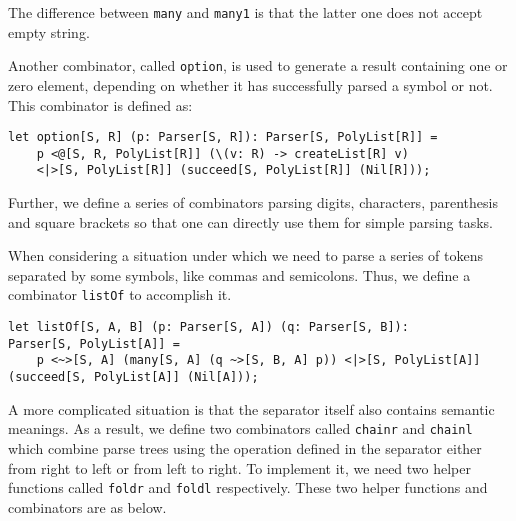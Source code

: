 The difference between \texttt{many} and \texttt{many1} is that the latter one does not accept empty string.

Another combinator, called \texttt{option}, is used to generate a result containing one or zero element, depending on whether it has successfully parsed a symbol or not. This combinator is defined as:

\begin{lstlisting}
let option[S, R] (p: Parser[S, R]): Parser[S, PolyList[R]] =
    p <@[S, R, PolyList[R]] (\(v: R) -> createList[R] v)
    <|>[S, PolyList[R]] (succeed[S, PolyList[R]] (Nil[R]));
\end{lstlisting}

Further, we define a series of combinators parsing digits, characters, parenthesis and square brackets so that one can directly use them for simple parsing tasks.

When considering a situation under which we need to parse a series of tokens separated by some symbols, like commas and semicolons. Thus, we define a combinator \texttt{listOf} to accomplish it.

\begin{lstlisting}
let listOf[S, A, B] (p: Parser[S, A]) (q: Parser[S, B]):
Parser[S, PolyList[A]] =
    p <~>[S, A] (many[S, A] (q ~>[S, B, A] p)) <|>[S, PolyList[A]] (succeed[S, PolyList[A]] (Nil[A]));
\end{lstlisting}

A more complicated situation is that the separator itself also contains semantic meanings. As a result, we define two combinators called \texttt{chainr} and \texttt{chainl} which combine parse trees using the operation defined in the separator either from right to left or from left to right. To implement it, we need two helper functions called \texttt{foldr} and \texttt{foldl} respectively. These two helper functions and combinators are as below.

